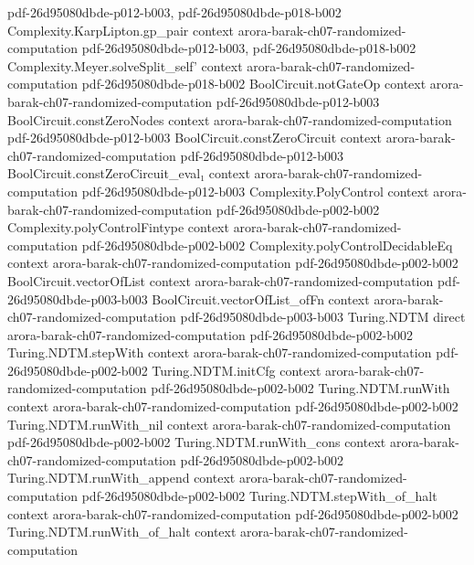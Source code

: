 \begin{theorem}
  {pdf-26d95080dbde-p012-b003,
    pdf-26d95080dbde-p018-b002}
\proofstep
  {Complexity.KarpLipton.gp_pair}
  {context}
  {arora-barak-ch07-randomized-computation}
  {pdf-26d95080dbde-p012-b003,
    pdf-26d95080dbde-p018-b002}
\proofstep
  {Complexity.Meyer.solveSplit_self'}
  {context}
  {arora-barak-ch07-randomized-computation}
  {pdf-26d95080dbde-p018-b002}
\proofstep
  {BoolCircuit.notGateOp}
  {context}
  {arora-barak-ch07-randomized-computation}
  {pdf-26d95080dbde-p012-b003}
\proofstep
  {BoolCircuit.constZeroNodes}
  {context}
  {arora-barak-ch07-randomized-computation}
  {pdf-26d95080dbde-p012-b003}
\proofstep
  {BoolCircuit.constZeroCircuit}
  {context}
  {arora-barak-ch07-randomized-computation}
  {pdf-26d95080dbde-p012-b003}
\proofstep
  {BoolCircuit.constZeroCircuit_eval₁}
  {context}
  {arora-barak-ch07-randomized-computation}
  {pdf-26d95080dbde-p012-b003}
\proofstep
  {Complexity.PolyControl}
  {context}
  {arora-barak-ch07-randomized-computation}
  {pdf-26d95080dbde-p002-b002}
\proofstep
  {Complexity.polyControlFintype}
  {context}
  {arora-barak-ch07-randomized-computation}
  {pdf-26d95080dbde-p002-b002}
\proofstep
  {Complexity.polyControlDecidableEq}
  {context}
  {arora-barak-ch07-randomized-computation}
  {pdf-26d95080dbde-p002-b002}
\proofstep
  {BoolCircuit.vectorOfList}
  {context}
  {arora-barak-ch07-randomized-computation}
  {pdf-26d95080dbde-p003-b003}
\proofstep
  {BoolCircuit.vectorOfList_ofFn}
  {context}
  {arora-barak-ch07-randomized-computation}
  {pdf-26d95080dbde-p003-b003}
\proofstep
  {Turing.NDTM}
  {direct}
  {arora-barak-ch07-randomized-computation}
  {pdf-26d95080dbde-p002-b002}
\proofstep
  {Turing.NDTM.stepWith}
  {context}
  {arora-barak-ch07-randomized-computation}
  {pdf-26d95080dbde-p002-b002}
\proofstep
  {Turing.NDTM.initCfg}
  {context}
  {arora-barak-ch07-randomized-computation}
  {pdf-26d95080dbde-p002-b002}
\proofstep
  {Turing.NDTM.runWith}
  {context}
  {arora-barak-ch07-randomized-computation}
  {pdf-26d95080dbde-p002-b002}
\proofstep
  {Turing.NDTM.runWith_nil}
  {context}
  {arora-barak-ch07-randomized-computation}
  {pdf-26d95080dbde-p002-b002}
\proofstep
  {Turing.NDTM.runWith_cons}
  {context}
  {arora-barak-ch07-randomized-computation}
  {pdf-26d95080dbde-p002-b002}
\proofstep
  {Turing.NDTM.runWith_append}
  {context}
  {arora-barak-ch07-randomized-computation}
  {pdf-26d95080dbde-p002-b002}
\proofstep
  {Turing.NDTM.stepWith_of_halt}
  {context}
  {arora-barak-ch07-randomized-computation}
  {pdf-26d95080dbde-p002-b002}
\proofstep
  {Turing.NDTM.runWith_of_halt}
  {context}
  {arora-barak-ch07-randomized-computation}

\end{theorem}
